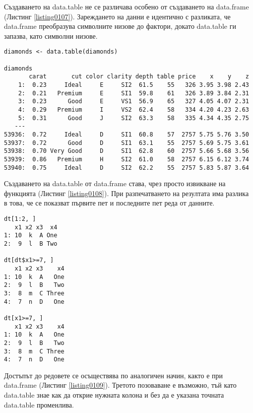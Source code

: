 Създаването на data.table не се различава особено от създаването на data.frame (Листинг \ref{listing0107}). Зареждането на данни е идентично с разликата, че data.frame преобразува символните низове до фактори, докато data.table ги запазва, като символни низове. 

\begin{lstlisting}[caption=Зареждане на data.table от data.frame, label=listing0108]
diamonds <- data.table(diamonds)

diamonds
       carat       cut color clarity depth table price    x    y    z
    1:  0.23     Ideal     E     SI2  61.5    55   326 3.95 3.98 2.43
    2:  0.21   Premium     E     SI1  59.8    61   326 3.89 3.84 2.31
    3:  0.23      Good     E     VS1  56.9    65   327 4.05 4.07 2.31
    4:  0.29   Premium     I     VS2  62.4    58   334 4.20 4.23 2.63
    5:  0.31      Good     J     SI2  63.3    58   335 4.34 4.35 2.75
   ---                                                               
53936:  0.72     Ideal     D     SI1  60.8    57  2757 5.75 5.76 3.50
53937:  0.72      Good     D     SI1  63.1    55  2757 5.69 5.75 3.61
53938:  0.70 Very Good     D     SI1  62.8    60  2757 5.66 5.68 3.56
53939:  0.86   Premium     H     SI2  61.0    58  2757 6.15 6.12 3.74
53940:  0.75     Ideal     D     SI2  62.2    55  2757 5.83 5.87 3.64
\end{lstlisting}

Създаването на data.table от data.frame става, чрез просто извикване на функцията (Листинг \ref{listing0108}). При разпечатването на резултата има разлика в това, че се показват първите пет и последните пет реда от данните. 

\begin{lstlisting}[caption=Достъп до редовете, label=listing0109]
dt[1:2, ]
   x1 x2 x3  x4
1: 10  k  A One
2:  9  l  B Two

dt[dt$x1>=7, ]
   x1 x2 x3    x4
1: 10  k  A   One
2:  9  l  B   Two
3:  8  m  C Three
4:  7  n  D   One

dt[x1>=7, ]
   x1 x2 x3    x4
1: 10  k  A   One
2:  9  l  B   Two
3:  8  m  C Three
4:  7  n  D   One
\end{lstlisting}

Достъпът до редовете се осъществява по аналогичен начин, както е при data.frame (Листинг \ref{listing0109}). Третото позоваване е възможно, тъй като data.table знае как да открие нужната колона и без да е указана точната data.table променлива. 

